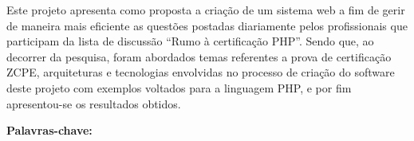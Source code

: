 \begin{singlespace}
\noindent 
Este projeto apresenta como proposta a criação de um sistema web a fim de gerir
de maneira mais eficiente as questões postadas diariamente pelos
profissionais que participam da lista de discussão ``Rumo à certificação
PHP''.
Sendo que, ao decorrer da pesquisa, foram abordados temas referentes a prova de 
certificação \acs{ZCPE}, arquiteturas e tecnologias envolvidas no processo de 
criação do software deste projeto com exemplos voltados para a linguagem
\acs{PHP}, e por fim apresentou-se os resultados obtidos.

\textbf{Palavras-chave:} \textsf{\ptBRKeyword}
\end{singlespace}